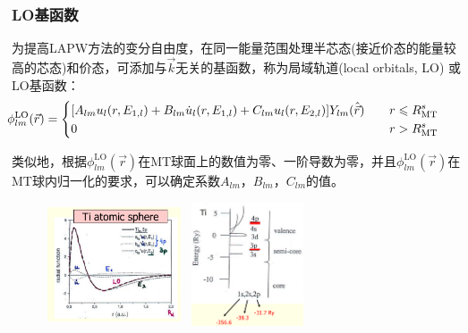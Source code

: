 \documentclass[cjk,slidestop,compress,mathserif,blue]{beamer}
\begin{document}
\frame
{
\frametitle{\textrm{LO}基函数}
为提高\textrm{LAPW}方法的变分自由度，在同一能量范围处理半芯态(接近价态的能量较高的芯态)和价态，可添加与$\vec k$无关的基函数，称为局域轨道(\textrm{local orbitals, LO})%
或\textrm{LO}基函数：
{\footnotesize
$$\hskip -22pt \phi_{lm}^{\mathrm{LO}}(\vec r)=\left\{
  \begin{aligned}
    &[A_{lm}u_l(r,E_{1,l})+B_{lm}\dot u_l(r,E_{1,l})+C_{lm}u_l(r,E_{2,l})]Y_{lm}(\hat{\vec r})\quad&r\leqslant R_{\mathrm{MT}}^s\\
    &0 &r>R_{\mathrm{MT}}^s
\end{aligned}
\right.$$}

类似地，根据$\phi_{lm}^{\mathrm{LO}}(\vec r)$在\textrm{MT}球面上的数值为零、一阶导数为零，并且$\phi_{lm}^{\mathrm{LO}}(\vec r)$在\textrm{MT}球内归一化的要求，可以确定系数$A_{lm}$，$B_{lm}$，$C_{lm}$的值。
\begin{figure}[h!]
	\vspace{-15pt}
\centering
\hspace{15pt}
\includegraphics[height=1.45in,width=1.55in,viewport=50 10 470 415,clip]{Figures/WIEN2k-lo.png}
\includegraphics[height=1.45in,width=1.45in,viewport=5 1 570 570,clip]{Figures/semi-core.png}
\caption{\small \textrm{}}%
\label{Muffin_tin_LO}
\end{figure}
}
\end{document}
